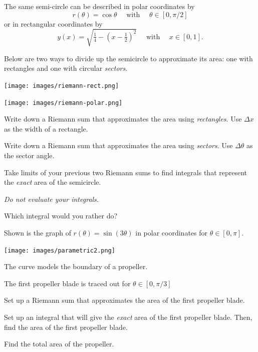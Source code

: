\documentclass{workbook}
\begin{document}
\begin{slide}
	\question
		The same semi-circle can be described in polar coordinates by
		\[
r(\theta)=\cos\theta\quad\text{ with }\quad\theta\in[0,\pi/2]
		\]
		 or in rectangular
		coordinates by \[
		y(x)=\sqrt{\tfrac{1}{4}-\left(x-\tfrac{1}{2}\right)^2}\quad\text{ with }\quad x\in[0,1].
		\]

		Below are two ways to divide up the semicircle to approximate its area: one with rectangles and one with circular \emph{sectors}.
		\begin{center}
	\texttt{[image: images/riemann-rect.png]}
		\end{center}
		\begin{center}
	\texttt{[image: images/riemann-polar.png]}
		\end{center}

	
	\begin{parts}
		\item Write down a Riemann sum that approximates the area using 
		\emph{rectangles}. Use $\Delta x$ as the width of a rectangle.

		\item Write down a Riemann sum that approximates the area using 
		\emph{sectors}. Use $\Delta \theta$ as the sector angle.
		
		\item Take limits of your previous two Riemann sums to find 
		integrals that represent the \emph{exact} area of the semicircle. 

		\emph{Do not evaluate your integrals.}

		\item Which integral would you rather do?
	\end{parts}
\end{slide}

\begin{slide}
	\question

		Shown is the graph of $\displaystyle
		r(\theta)=\sin(3\theta)
		$
		in polar coordinates
		for $\theta\in[0,\pi]$.
		\begin{center}
	\texttt{[image: images/parametric2.png]}
		\end{center}

	
	The curve models the boundary of a propeller.

	\begin{parts}
		\item The first propeller blade is traced out for $\theta\in[0,\pi/3]$
		
		Set up a Riemann sum that approximates the area of the first propeller
		blade.

		\item Set up an integral that will give the \emph{exact} area of the
		first propeller blade. Then, find the area of the first propeller blade.

		\item Find the total area of the propeller.
	\end{parts}
\end{slide}
\end{document}
